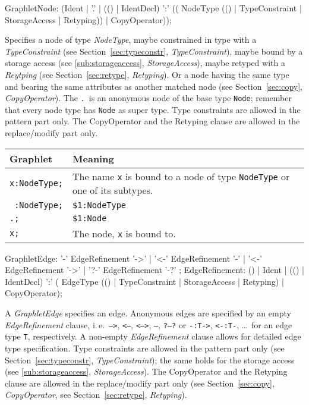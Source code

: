 \begin{rail}
GraphletNode: (Ident | 
    '.' |
    (() | IdentDecl) ':' (( NodeType (() | TypeConstraint | StorageAccess | Retyping)) | CopyOperator));   
\end{rail}
Specifies a node of type \emph{NodeType},
maybe constrained in type with a \emph{TypeConstraint} (see Section~\ref{sec:typeconstr}, \emph{TypeConstraint}),
maybe bound by a storage access (see \ref{sub:storageaccess}, \emph{StorageAccess}),
maybe retyped with a \emph{Reytping} (see Section~\ref{sec:retype}, \emph{Retyping}).
Or a node having the same type and bearing the same attributes as another matched node (see Section~\ref{sec:copy}, \emph{CopyOperator}).
The \texttt{.}\ is an anonymous node of the base type \texttt{Node}; remember that every node type has \texttt{Node} as super type. 
Type constraints are allowed in the pattern part only. 
The CopyOperator and the Retyping clause are allowed in the replace/modify part only.
\begin{center}
  \begin{tabularx}{\linewidth}{lX}
    \textbf{Graphlet} & \textbf{Meaning}\\ \hline
    \texttt{x:NodeType;} & The name \texttt{x} is bound to a node of type \texttt{NodeType} or one of its subtypes. \\
    \texttt{ :NodeType;} & \texttt{\$1:NodeType} \\
    \texttt{.;} & \texttt{\$1:Node} \\
    \texttt{x;} & The node, \texttt{x} is bound to.
  \end{tabularx}
\end{center} 

\begin{rail}
  GraphletEdge: '-' EdgeRefinement '->'  | '<-' EdgeRefinement '-'  | '<-' EdgeRefinement '->' | '?-' EdgeRefinement '-?' ;
  EdgeRefinement: () | Ident | (() | IdentDecl) ':' ( EdgeType (() | TypeConstraint | StorageAccess | Retyping) | CopyOperator);
\end{rail}
A \emph{GraphletEdge} specifies an edge. 
Anonymous edges are specified by an empty \emph{EdgeRefinement} clause, i.\,e.\ \texttt{-->}, \texttt{<--}, \texttt{<-->}, \texttt{--}, \texttt{?--?} or \texttt{-:T->}, \texttt{<-:T-}, \dots\ for an edge type \texttt{T}, respectively. 
A non-empty \emph{EdgeRefinement} clause allows for detailed edge type specification. 
Type constraints are allowed in the pattern part only (see Section~\ref{sec:typeconstr}, \emph{TypeConstraint}); the same holds for the storage access (see \ref{sub:storageaccess}, \emph{StorageAccess}).
The CopyOperator and the Retyping clause are allowed in the replace/modify part only (see Section~\ref{sec:copy}, \emph{CopyOperator}, see Section~\ref{sec:retype}, \emph{Retyping}).

